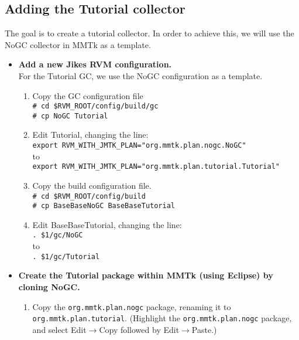 \documentclass{article}
\newcommand{\cmd}[1]{\texttt{\# #1}}
\newcommand{\shline}[1]{\texttt{#1}}
\newcommand{\code}[1]{\texttt{#1}}
\newcommand{\file}[1]{\textsf{#1}}
\newcommand{\menu}[0]{$\rightarrow$}
\begin{document}
\subsection{Adding the Tutorial collector}

The goal is to create a tutorial collector. In order to achieve
this, we will use the NoGC collector in MMTk as a template.

\begin{itemize}
\item \textbf{Add a new Jikes RVM configuration.} \\
    For the Tutorial GC, we use the NoGC configuration as a
    template.
    \begin{enumerate}
    \item Copy the GC configuration file \\
    \cmd{cd \$RVM\_ROOT/config/build/gc} \\
    \cmd{cp NoGC Tutorial}

    \item Edit \file{Tutorial}, changing the line: \\
    \shline{export RVM\_WITH\_JMTK\_PLAN="org.mmtk.plan.nogc.NoGC"} \\ to \\
    \shline{export RVM\_WITH\_JMTK\_PLAN="org.mmtk.plan.tutorial.Tutorial"}

    \item Copy the build configuration file. \\
    \cmd{cd \$RVM\_ROOT/config/build} \\
    \cmd{cp BaseBaseNoGC BaseBaseTutorial}

    \item Edit \file{BaseBaseTutorial}, changing the line: \\
    \shline{. \$1/gc/NoGC} \\ to \\
    \shline{. \$1/gc/Tutorial}

    \end{enumerate}

\item \textbf{Create the Tutorial package within MMTk (using Eclipse) by cloning NoGC.}
    \begin{enumerate}
    \item Copy the \code{org.mmtk.plan.nogc} package, renaming it to
    \code{org.mmtk.plan.tutorial}. (Highlight the \code{org.mmtk.plan.nogc} package, and
    select Edit\menu{}Copy followed by Edit\menu{}Paste.)


\end{enumerate}
\end{itemize}
\end{document}
